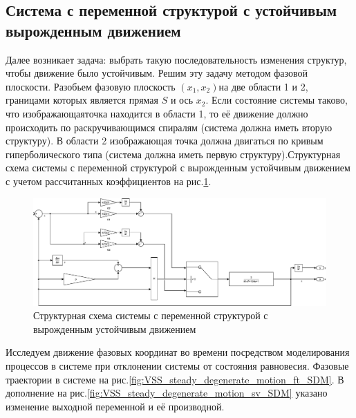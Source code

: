 \clearpage
\subsection{Система с переменной структурой  с устойчивым вырожденным движением} \label{title:VSS_SDM}
Далее возникает задача: выбрать такую последовательность изменения структур, чтобы движение было устойчивым. Решим эту задачу методом фазовой плоскости. Разобьем фазовую плоскость $(x_1,x_2)$на две области 1 и 2, границами которых является прямая $S$ и ось $x_2$. Если состояние системы таково, что изображающаяточка находится в области 1, то её движение должно происходить по раскручивающимся спиралям (система должна иметь вторую структуру). В области 2  изображающая точка должна двигаться по кривым гиперболического типа (система должна иметь первую структуру).Структурная схема системы с переменной структурой с вырожденным устойчивым движением с учетом рассчитанных коэффициентов на рис.\ref{fig:sim_VSS_steady_degenerate_motion}.
\begin{figure}[!h]\centering
\includegraphics[width=1.0\linewidth]{images/sim_VSS_steady_degenerate_motion}
\caption{Структурная схема системы с переменной структурой с вырожденным устойчивым движением}\label{fig:sim_VSS_steady_degenerate_motion}
\end{figure}
Исследуем движение фазовых координат во времени посредством моделирования процессов в системе при отклонении системы от состояния равновесия. Фазовые траектории в системе на рис.\ref{fig:VSS_steady_degenerate_motion_ft_SDM}. 
В дополнение на рис.\ref{fig:VSS_steady_degenerate_motion_sv_SDM} указано изменение выходной переменной и её производной. 
